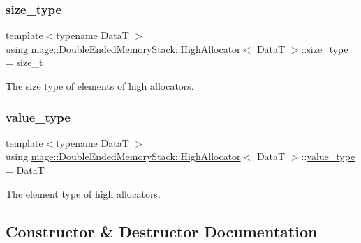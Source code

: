 \subsubsection{\texorpdfstring{size\+\_\+type}{size\_type}}
{\footnotesize\ttfamily template$<$typename DataT $>$ \\
using \hyperlink{structmage_1_1_double_ended_memory_stack_1_1_high_allocator}{mage\+::\+Double\+Ended\+Memory\+Stack\+::\+High\+Allocator}$<$ DataT $>$\+::\hyperlink{structmage_1_1_double_ended_memory_stack_1_1_high_allocator_a0d2e29171c7898850631b1a57a29fe0d}{size\+\_\+type} =  size\+\_\+t}

The size type of elements of high allocators. \hypertarget{structmage_1_1_double_ended_memory_stack_1_1_high_allocator_a43b87cea37b3bbba57ca794e9785e82d}{}\label{structmage_1_1_double_ended_memory_stack_1_1_high_allocator_a43b87cea37b3bbba57ca794e9785e82d} 
\subsubsection{\texorpdfstring{value\+\_\+type}{value\_type}}
{\footnotesize\ttfamily template$<$typename DataT $>$ \\
using \hyperlink{structmage_1_1_double_ended_memory_stack_1_1_high_allocator}{mage\+::\+Double\+Ended\+Memory\+Stack\+::\+High\+Allocator}$<$ DataT $>$\+::\hyperlink{structmage_1_1_double_ended_memory_stack_1_1_high_allocator_a43b87cea37b3bbba57ca794e9785e82d}{value\+\_\+type} =  DataT}

The element type of high allocators. 

\subsection{Constructor \& Destructor Documentation}
\hypertarget{structmage_1_1_double_ended_memory_stack_1_1_high_allocator_a2add3798ed5b619bc1e44885de0325cd}{}\label{structmage_1_1_double_ended_memory_stack_1_1_high_allocator_a2add3798ed5b619bc1e44885de0325cd} 
